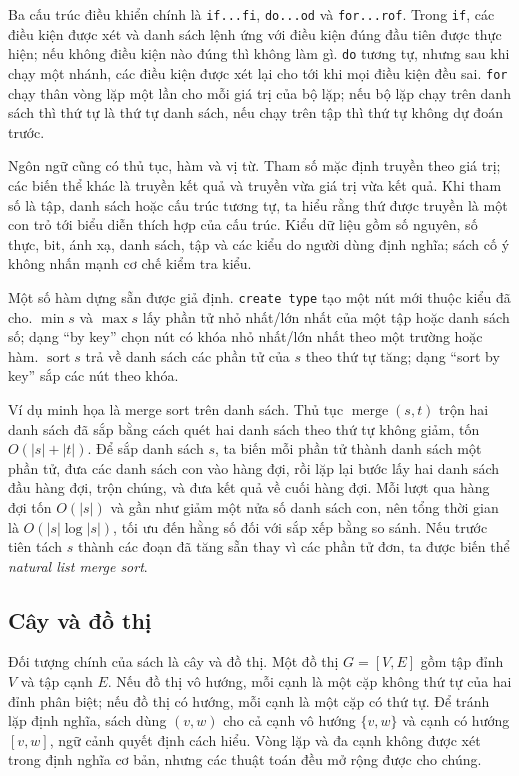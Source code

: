\documentclass[11pt]{article}
\begin{document}
Ba cấu trúc điều khiển chính là \texttt{if...fi}, \texttt{do...od} và
\texttt{for...rof}. Trong \texttt{if}, các điều kiện được xét và danh sách lệnh
ứng với điều kiện đúng đầu tiên được thực hiện; nếu không điều kiện nào đúng thì
không làm gì. \texttt{do} tương tự, nhưng sau khi chạy một nhánh, các điều kiện
được xét lại cho tới khi mọi điều kiện đều sai. \texttt{for} chạy thân vòng lặp
một lần cho mỗi giá trị của bộ lặp; nếu bộ lặp chạy trên danh sách thì thứ tự là
thứ tự danh sách, nếu chạy trên tập thì thứ tự không dự đoán trước.

Ngôn ngữ cũng có thủ tục, hàm và vị từ. Tham số mặc định truyền theo giá trị;
các biến thể khác là truyền kết quả và truyền vừa giá trị vừa kết quả. Khi tham
số là tập, danh sách hoặc cấu trúc tương tự, ta hiểu rằng thứ được truyền là một
con trỏ tới biểu diễn thích hợp của cấu trúc. Kiểu dữ liệu gồm số nguyên, số
thực, bit, ánh xạ, danh sách, tập và các kiểu do người dùng định nghĩa; sách cố
ý không nhấn mạnh cơ chế kiểm tra kiểu.

Một số hàm dựng sẵn được giả định. \texttt{create type} tạo một nút mới thuộc
kiểu đã cho. \(\min s\) và \(\max s\) lấy phần tử nhỏ nhất/lớn nhất của một tập
hoặc danh sách số; dạng ``by key'' chọn nút có khóa nhỏ nhất/lớn nhất theo một
trường hoặc hàm. \(\operatorname{sort} s\) trả về danh sách các phần tử của \(s\)
theo thứ tự tăng; dạng ``sort by key'' sắp các nút theo khóa.

Ví dụ minh họa là merge sort trên danh sách. Thủ tục \(\operatorname{merge}(s,t)\)
trộn hai danh sách đã sắp bằng cách quét hai danh sách theo thứ tự không giảm,
tốn \(O(|s|+|t|)\). Để sắp danh sách \(s\), ta biến mỗi phần tử thành danh sách
một phần tử, đưa các danh sách con vào hàng đợi, rồi lặp lại bước lấy hai danh
sách đầu hàng đợi, trộn chúng, và đưa kết quả về cuối hàng đợi. Mỗi lượt qua
hàng đợi tốn \(O(|s|)\) và gần như giảm một nửa số danh sách con, nên tổng thời
gian là \(O(|s|\log |s|)\), tối ưu đến hằng số đối với sắp xếp bằng so sánh.
Nếu trước tiên tách \(s\) thành các đoạn đã tăng sẵn thay vì các phần tử đơn,
ta được biến thể \emph{natural list merge sort}.

\subsection*{Cây và đồ thị}

Đối tượng chính của sách là cây và đồ thị. Một đồ thị \(G=[V,E]\) gồm tập đỉnh
\(V\) và tập cạnh \(E\). Nếu đồ thị vô hướng, mỗi cạnh là một cặp không thứ tự
của hai đỉnh phân biệt; nếu đồ thị có hướng, mỗi cạnh là một cặp có thứ tự. Để
tránh lặp định nghĩa, sách dùng \((v,w)\) cho cả cạnh vô hướng \(\{v,w\}\) và
cạnh có hướng \([v,w]\), ngữ cảnh quyết định cách hiểu. Vòng lặp và đa cạnh
không được xét trong định nghĩa cơ bản, nhưng các thuật toán đều mở rộng được
cho chúng.
\end{document}
